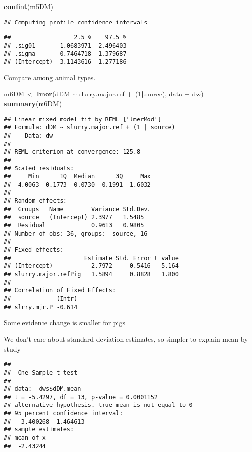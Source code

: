\documentclass[
]{article}
\newenvironment{Shaded}{\begin{snugshade}}{\end{snugshade}}
\newcommand{\AttributeTok}[1]{\textcolor[rgb]{0.13,0.29,0.53}{#1}}
\newcommand{\DecValTok}[1]{\textcolor[rgb]{0.00,0.00,0.81}{#1}}
\newcommand{\FunctionTok}[1]{\textcolor[rgb]{0.13,0.29,0.53}{\textbf{#1}}}
\newcommand{\NormalTok}[1]{#1}
\newcommand{\OtherTok}[1]{\textcolor[rgb]{0.56,0.35,0.01}{#1}}
\newcommand{\SpecialCharTok}[1]{\textcolor[rgb]{0.81,0.36,0.00}{\textbf{#1}}}
\begin{document}
\begin{Shaded}
\begin{Highlighting}[]
\FunctionTok{confint}\NormalTok{(m5DM)}
\end{Highlighting}
\end{Shaded}

\begin{verbatim}
## Computing profile confidence intervals ...
\end{verbatim}

\begin{verbatim}
##                  2.5 %    97.5 %
## .sig01       1.0683971  2.496403
## .sigma       0.7464718  1.379687
## (Intercept) -3.1143616 -1.277186
\end{verbatim}

Compare among animal types.

\begin{Shaded}
\begin{Highlighting}[]
\NormalTok{m6DM }\OtherTok{\textless{}{-}} \FunctionTok{lmer}\NormalTok{(dDM }\SpecialCharTok{\textasciitilde{}}\NormalTok{ slurry.major.ref }\SpecialCharTok{+}\NormalTok{  (}\DecValTok{1}\SpecialCharTok{|}\NormalTok{source), }\AttributeTok{data =}\NormalTok{ dw)}
\FunctionTok{summary}\NormalTok{(m6DM)}
\end{Highlighting}
\end{Shaded}

\begin{verbatim}
## Linear mixed model fit by REML ['lmerMod']
## Formula: dDM ~ slurry.major.ref + (1 | source)
##    Data: dw
## 
## REML criterion at convergence: 125.8
## 
## Scaled residuals: 
##     Min      1Q  Median      3Q     Max 
## -4.0063 -0.1773  0.0730  0.1991  1.6032 
## 
## Random effects:
##  Groups   Name        Variance Std.Dev.
##  source   (Intercept) 2.3977   1.5485  
##  Residual             0.9613   0.9805  
## Number of obs: 36, groups:  source, 16
## 
## Fixed effects:
##                     Estimate Std. Error t value
## (Intercept)          -2.7972     0.5416  -5.164
## slurry.major.refPig   1.5894     0.8828   1.800
## 
## Correlation of Fixed Effects:
##             (Intr)
## slrry.mjr.P -0.614
\end{verbatim}

Some evidence change is smaller for pigs.

We don't care about standard deviation estimates, so simpler to explain
mean by study.

\begin{Shaded}
\end{Shaded}

\begin{verbatim}
## 
##  One Sample t-test
## 
## data:  dws$dDM.mean
## t = -5.4297, df = 13, p-value = 0.0001152
## alternative hypothesis: true mean is not equal to 0
## 95 percent confidence interval:
##  -3.400268 -1.464613
## sample estimates:
## mean of x 
##  -2.43244
\end{verbatim}
\end{document}
